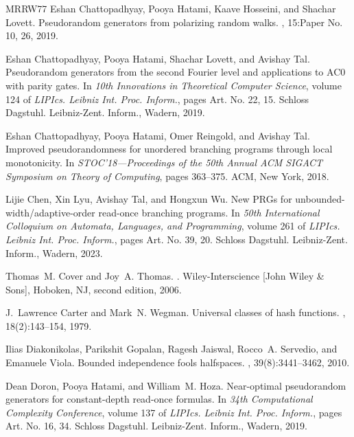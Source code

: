 \documentclass[10pt,a4paper]{article}
\theoremstyle{definition}
\begin{document}
\begin{thebibliography}{MRRW77}
Eshan Chattopadhyay, Pooya Hatami, Kaave Hosseini, and Shachar Lovett.
\newblock Pseudorandom generators from polarizing random walks.
, 15:Paper No. 10, 26, 2019.

Eshan Chattopadhyay, Pooya Hatami, Shachar Lovett, and Avishay Tal.
\newblock Pseudorandom generators from the second {F}ourier level and applications to {AC}0 with parity gates.
\newblock In {\em 10th {I}nnovations in {T}heoretical {C}omputer {S}cience}, volume 124 of {\em LIPIcs. Leibniz Int. Proc. Inform.}, pages Art. No. 22, 15. Schloss Dagstuhl. Leibniz-Zent. Inform., Wadern, 2019.

Eshan Chattopadhyay, Pooya Hatami, Omer Reingold, and Avishay Tal.
\newblock Improved pseudorandomness for unordered branching programs through local monotonicity.
\newblock In {\em S{TOC}'18---{P}roceedings of the 50th {A}nnual {ACM} {SIGACT} {S}ymposium on {T}heory of {C}omputing}, pages 363--375. ACM, New York, 2018.

Lijie Chen, Xin Lyu, Avishay Tal, and Hongxun Wu.
\newblock New {PRG}s for unbounded-width/adaptive-order read-once branching programs.
\newblock In {\em 50th {I}nternational {C}olloquium on {A}utomata, {L}anguages, and {P}rogramming}, volume 261 of {\em LIPIcs. Leibniz Int. Proc. Inform.}, pages Art. No. 39, 20. Schloss Dagstuhl. Leibniz-Zent. Inform., Wadern, 2023.

Thomas~M. Cover and Joy~A. Thomas.
.
\newblock Wiley-Interscience [John Wiley \& Sons], Hoboken, NJ, second edition, 2006.

J.~Lawrence Carter and Mark~N. Wegman.
\newblock Universal classes of hash functions.
, 18(2):143--154, 1979.

Ilias Diakonikolas, Parikshit Gopalan, Ragesh Jaiswal, Rocco~A. Servedio, and Emanuele Viola.
\newblock Bounded independence fools halfspaces.
, 39(8):3441--3462, 2010.

Dean Doron, Pooya Hatami, and William~M. Hoza.
\newblock Near-optimal pseudorandom generators for constant-depth read-once formulas.
\newblock In {\em 34th {C}omputational {C}omplexity {C}onference}, volume 137 of {\em LIPIcs. Leibniz Int. Proc. Inform.}, pages Art. No. 16, 34. Schloss Dagstuhl. Leibniz-Zent. Inform., Wadern, 2019.


\end{thebibliography}
\end{document}
